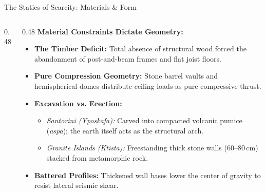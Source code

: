 \begin{frame}[label=scarcity]{The Statics of Scarcity: Materials \& Form}
  \begin{columns}[T, onlytextwidth]
    \begin{column}{0.48\textwidth}
    \end{column}

    \begin{column}{0.48\textwidth}
      \textbf{\color{aegeanblue}Material Constraints Dictate Geometry:}
      \vspace{0.2em}
      \begin{itemize}
          \setlength{\itemsep}{0.15em}
        \item \textbf{The Timber Deficit:} Total absence of structural wood forced the abandonment of post-and-beam frames and flat joist floors.
        \item \textbf{Pure Compression Geometry:} Stone barrel vaults and hemispherical domes distribute ceiling loads as pure compressive thrust.
        \item \textbf{Excavation vs. Erection:}
          \begin{itemize}
            \item \textit{Santorini (Yposkafa):} Carved into compacted volcanic pumice (\textit{aspa}); the earth itself acts as the structural arch.
            \item \textit{Granite Islands (Ktista):} Freestanding thick stone walls (60--80\,cm) stacked from metamorphic rock.
          \end{itemize}
        \item \textbf{Battered Profiles:} Thickened wall bases lower the center of gravity to resist lateral seismic shear.
      \end{itemize}
    \end{column}
  \end{columns}
\end{frame}
